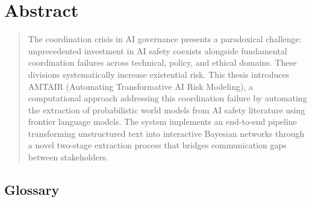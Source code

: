 \documentclass[
  11pt,
  letterpaper,
  openany]{book}
\begin{document}
\chapter{Abstract}\label{sec-abstract}

\begin{quote}
The coordination crisis in AI governance presents a paradoxical
challenge: unprecedented investment in AI safety coexists alongside
fundamental coordination failures across technical, policy, and ethical
domains. These divisions systematically increase existential risk. This
thesis introduces AMTAIR (Automating Transformative AI Risk Modeling), a
computational approach addressing this coordination failure by
automating the extraction of probabilistic world models from AI safety
literature using frontier language models. The system implements an
end-to-end pipeline transforming unstructured text into interactive
Bayesian networks through a novel two-stage extraction process that
bridges communication gaps between stakeholders.
\end{quote}

\section*{Glossary}\label{glossary}

\end{document}
